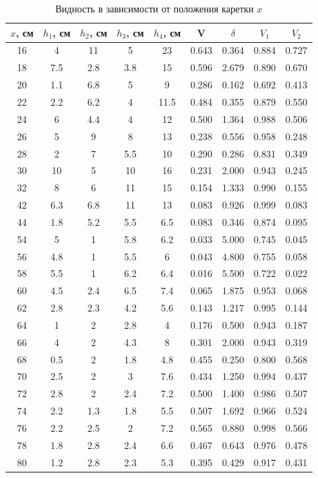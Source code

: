 \documentclass[a4paper,12pt]{article}
\begin{document}
\begin{table}[H]
	\centering
	\begin{tabular}{|c|c|c|c|c|c|c|c|c|}
		\hline
		$x$, см  & $h_1$, см & $h_2$, см & $h_3$, см & $h_4$, см & V     & $\delta$ & $V_1$  & $V_2$  \\ \hline
		16 & 4    & 11   & 5    & 23   & 0.643 & 0.364 & 0.884 & 0.727 \\ \hline
		18 & 7.5  & 2.8  & 3.8  & 15   & 0.596 & 2.679 & 0.890 & 0.670 \\ \hline
		20 & 1.1  & 6.8  & 5    & 9    & 0.286 & 0.162 & 0.692 & 0.413 \\ \hline
		22 & 2.2  & 6.2  & 4    & 11.5 & 0.484 & 0.355 & 0.879 & 0.550 \\ \hline
		24 & 6    & 4.4  & 4    & 12   & 0.500 & 1.364 & 0.988 & 0.506 \\ \hline
		26 & 5    & 9    & 8    & 13   & 0.238 & 0.556 & 0.958 & 0.248 \\ \hline
		28 & 2    & 7    & 5.5  & 10   & 0.290 & 0.286 & 0.831 & 0.349 \\ \hline
		30 & 10   & 5    & 10   & 16   & 0.231 & 2.000 & 0.943 & 0.245 \\ \hline
		32 & 8    & 6    & 11   & 15   & 0.154 & 1.333 & 0.990 & 0.155 \\ \hline
		42 & 6.3  & 6.8  & 11   & 13   & 0.083 & 0.926 & 0.999 & 0.083 \\ \hline
		44 & 1.8  & 5.2  & 5.5  & 6.5  & 0.083 & 0.346 & 0.874 & 0.095 \\ \hline
		54 & 5    & 1    & 5.8  & 6.2  & 0.033 & 5.000 & 0.745 & 0.045 \\ \hline
		56 & 4.8  & 1    & 5.5  & 6    & 0.043 & 4.800 & 0.755 & 0.058 \\ \hline
		58 & 5.5  & 1    & 6.2  & 6.4  & 0.016 & 5.500 & 0.722 & 0.022 \\ \hline
		60 & 4.5  & 2.4  & 6.5  & 7.4  & 0.065 & 1.875 & 0.953 & 0.068 \\ \hline
		62 & 2.8  & 2.3  & 4.2  & 5.6  & 0.143 & 1.217 & 0.995 & 0.144 \\ \hline
		64 & 1    & 2    & 2.8  & 4    & 0.176 & 0.500 & 0.943 & 0.187 \\ \hline
		66 & 4    & 2    & 4.3  & 8    & 0.301 & 2.000 & 0.943 & 0.319 \\ \hline
		68 & 0.5  & 2    & 1.8  & 4.8  & 0.455 & 0.250 & 0.800 & 0.568 \\ \hline
		70 & 2.5  & 2    & 3    & 7.6  & 0.434 & 1.250 & 0.994 & 0.437 \\ \hline
		72 & 2.8  & 2    & 2.4  & 7.2  & 0.500 & 1.400 & 0.986 & 0.507 \\ \hline
		74 & 2.2  & 1.3  & 1.8  & 5.5  & 0.507 & 1.692 & 0.966 & 0.524 \\ \hline
		76 & 2.2  & 2.5  & 2    & 7.2  & 0.565 & 0.880 & 0.998 & 0.566 \\ \hline
		78 & 1.8  & 2.8  & 2.4  & 6.6  & 0.467 & 0.643 & 0.976 & 0.478 \\ \hline
		80 & 1.2  & 2.8  & 2.3  & 5.3  & 0.395 & 0.429 & 0.917 & 0.431 \\ \hline
	\end{tabular}
	\caption{ Видность в зависимости от положения каретки  $x$}
\end{table}
\end{document}
